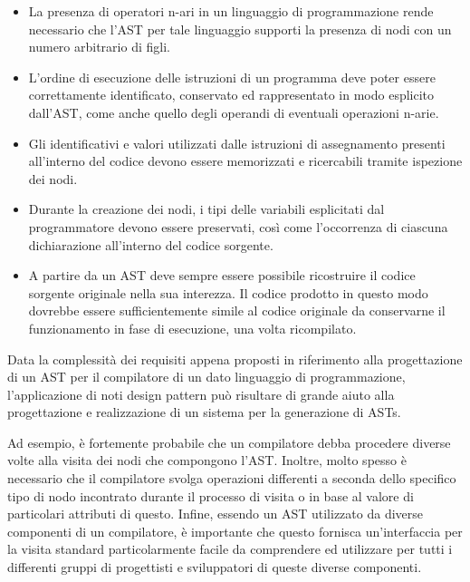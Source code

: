 \begin{itemize}

\item La presenza di operatori n-ari in un linguaggio di programmazione rende
necessario che l’AST per tale linguaggio supporti la presenza di nodi con un
numero arbitrario di figli.

\item L’ordine di esecuzione delle istruzioni di un programma deve poter essere
correttamente identificato, conservato ed rappresentato in modo esplicito
dall’AST, come anche quello degli operandi di eventuali operazioni n-arie.

\item Gli identificativi e valori utilizzati dalle istruzioni di assegnamento
presenti all’interno del codice devono essere memorizzati e ricercabili tramite
ispezione dei nodi.

\item Durante la creazione dei nodi, i tipi delle variabili esplicitati dal
programmatore devono essere preservati, così come l'occorrenza di ciascuna
dichiarazione all’interno del codice sorgente.

\item A partire da un AST deve sempre essere possibile ricostruire il codice
sorgente originale nella sua interezza. Il codice prodotto in questo modo
dovrebbe essere sufficientemente simile al codice originale da conservarne il
funzionamento in fase di esecuzione, una volta ricompilato.\\

\end{itemize}

Data la complessità dei requisiti appena proposti in riferimento alla
progettazione di un AST per il compilatore di un dato linguaggio di
programmazione, l’applicazione di noti design pattern può risultare di grande
aiuto alla progettazione e  realizzazione di un sistema per la generazione di
ASTs.

Ad esempio, è fortemente probabile che un compilatore debba procedere diverse
volte alla visita dei nodi che compongono l’AST. Inoltre, molto spesso è
necessario che il compilatore svolga operazioni differenti a seconda dello
specifico tipo di nodo incontrato durante il processo di visita o in base al
valore di particolari attributi di questo. Infine, essendo un AST utilizzato da
diverse componenti di un compilatore, è importante che questo fornisca
un’interfaccia per la visita standard particolarmente facile da comprendere ed
utilizzare per tutti i differenti gruppi di progettisti e sviluppatori di queste
diverse componenti.

